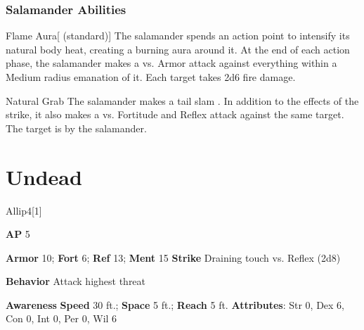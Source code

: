 \subsubsection{Salamander Abilities}

\begin{ability}{Flame Aura}[ (standard)]
The salamander spends an action point to intensify its natural body heat, creating a burning aura around it.
At the end of each action phase, the salamander makes a  vs. Armor
attack against everything within a Medium radius emanation of it.
\hit Each target takes 2d6 fire damage.
\end{ability}

\vspace{0.5em}
\begin{ability}{Natural Grab}
The salamander makes a tail slam .
In addition to the effects of the strike, it also makes a  vs. Fortitude and Reflex attack against the same target.
\hit The target is  by the salamander.
\end{ability}

\section{Undead}
\begin{monsection}{Allip}{4}[1]
\vspace{-1em}\vspace{-1em}
\begin{spellcontent}
\begin{spelltargetinginfo}
{\textbf{AP} 5}

\pari \textbf{Armor} 10;
\textbf{Fort} 6;
\textbf{Ref} 13;
\textbf{Ment} 15
\pari \textbf{Strike} Draining touch  vs. Reflex (2d8)



\pari \textbf{Behavior} Attack highest threat
\end{spelltargetinginfo}
\end{spellcontent}

\begin{monsterfooter}
\pari \textbf{Awareness} 
\pari \textbf{Speed} 30 ft.;
\textbf{Space} 5 ft.;
\textbf{Reach} 5 ft.
\pari \textbf{Attributes}:
Str 0,
Dex 6,
Con 0,
Int 0,
Per 0,
Wil 6
\end{monsterfooter}
\end{monsection}

